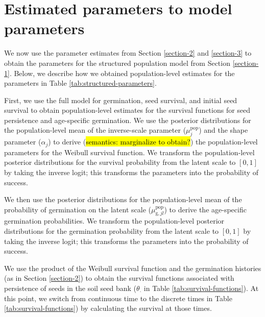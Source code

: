 \documentclass[12pt, oneside, titlepage]{article}   	%
\begin{document}
\section{Estimated parameters to model parameters}\label{section-4}

We now use the parameter estimates from Section \ref{section-2} and \ref{section-3} to obtain the parameters for the structured population model from Section \ref{section-1}. Below, we describe how we obtained population-level estimates for the parameters in Table \ref{tab:structured-parameters}.

First, we use the full model for germination, seed survival, and initial seed survival to obtain population-level estimates for the survival functions for seed persistence and age-specific germination. We use the posterior distributions for the population-level mean of the inverse-scale parameter ($\mu_j^\mathrm{pop}$) and the shape parameter ($\alpha_j$) to derive (\hl{semantics: marginalize to obtain?}) the population-level parameters for the Weibull survival function. We transform the population-level posterior distributions for the survival probability from the latent scale to $[0,1]$ by taking the inverse logit; this transforms the parameters into the probability of success.

We then use the posterior distributions for the population-level mean of the probability of germination on the latent scale ($\mu^\mathrm{pop}_{\mathrm{g},jl}$) to derive the age-specific germination probabilities. We transform the population-level posterior distributions for the germination probability from the latent scale to $[0,1]$ by taking the inverse logit; this transforms the parameters into the probability of success.

We use the product of the Weibull survival function and the germination histories (as in Section \ref{section-2}) to obtain the survival functions associated with persistence of seeds in the soil seed bank ($\theta_\cdot$ in Table \ref{tab:survival-functions}). At this point, we switch from continuous time to the discrete times in Table \ref{tab:survival-functions}) by calculating the survival at those times. 
\end{document}
